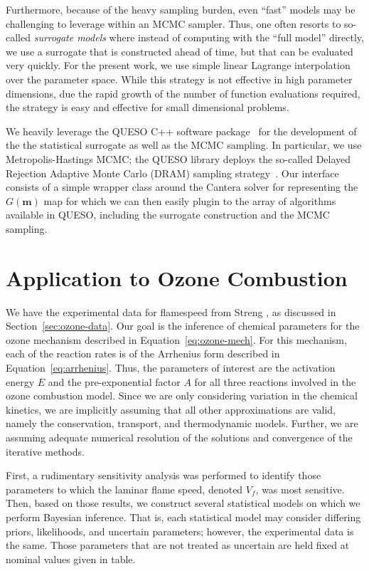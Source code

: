  Furthermore, because of the heavy sampling burden, even ``fast''
 models may be challenging to leverage within an MCMC sampler. Thus,
 one often resorts to so-called \emph{surrogate models} where instead of
 computing with the ``full model'' directly, we use a surrogate that
 is constructed ahead of time, but that can be evaluated very
 quickly. For the present work, we use simple linear Lagrange
 interpolation over the parameter space. While this strategy is not
 effective in high parameter dimensions, due the rapid growth of the
 number of function evaluations required, the strategy is easy and effective for small dimensional
 problems.

 We heavily leverage the QUESO C++ software package~\cite{QUESO} for the
 development of the the statistical surrogate as well as the MCMC
 sampling. In particular, we use Metropolis-Hastings MCMC; the QUESO
 library deploys the so-called Delayed Rejection Adaptive Monte Carlo
 (DRAM) sampling strategy~\cite{DRAM}. Our interface consists of a
 simple wrapper class around the Cantera solver for representing the
 $G(\mathbf{m})$ map for which we can then easily plugin to the array
 of algorithms available in QUESO, including the surrogate
 construction and the MCMC sampling.

\section{Application to Ozone Combustion}

 We have the experimental data for flamespeed from Streng
 \cite{Streng}, as discussed in Section~\ref{sec:ozone-data}.
 Our goal is the inference of
 chemical parameters for the ozone mechanism described in
 Equation~\eqref{eq:ozone-mech}. For this mechanism, each of the
 reaction rates is of the Arrhenius form described in
 Equation~\eqref{eq:arrhenius}.
 Thus, the parameters of interest are the
 activation energy $E$ and the
 pre-exponential factor $A$ for all three reactions involved in the
 ozone combustion model. Since we are only considering variation in
 the chemical kinetics, we are implicitly assuming that all other
 approximations are valid, namely the conservation, transport, and
 thermodynamic models. Further, we are assuming adequate numerical
 resolution of the solutions and convergence of the iterative methods.

 First, a rudimentary sensitivity analysis was performed to identify
 those parameters to which the laminar flame speed, denoted $V_f$, was most
 sensitive. Then, based on those results, we construct several
 statistical models on which we perform Bayesian inference. That is,
 each statistical model may consider differing priors, likelihoods,
 and uncertain parameters; however, the experimental data is the
 same. Those parameters that are not treated as uncertain are held
 fixed at nominal values given in table.

